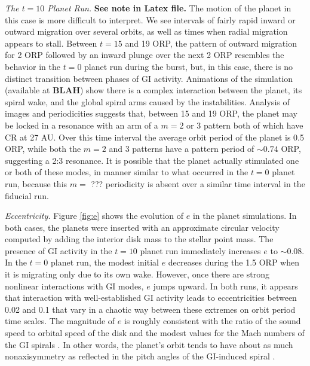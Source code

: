 \documentclass[12pt,manuscript,authoryear]{aastex}
\begin{document}
{\it The $t = 10$ Planet Run.} {\bf See note in Latex file.} The motion of the planet in this case is more difficult to interpret. We see intervals of fairly rapid inward or outward migration over several orbits, as well as times when radial migration appears to stall. Between $t = 15$ and 19 ORP, the pattern of outward migration for 2 ORP followed by an inward plunge over the next 2 ORP resembles the behavior in the $t = 0$ planet run during the burst, but, in this case, there is no distinct transition between phases of GI activity. Animations of the simulation (available at {\bf BLAH}) show there is a complex interaction between the planet, its spiral wake, and the global spiral arms caused by the instabilities. Analysis of images and periodicities suggests that, between 15 and 19 ORP, the planet may be locked in a resonance with an arm of a $m = 2$ or 3 pattern both of which have CR at 27 AU. Over this time interval the average orbit period of the planet is 0.5 ORP, while both the $m = 2$ and 3 patterns have a pattern period of $\sim 0.74$ ORP, suggesting a 2:3 resonance. It is possible that the planet actually stimulated one or both of these modes, in manner similar to what occurred in the $t = 0$ planet run, because this $m =$ ??? periodicity is absent over a similar time interval in the fiducial run.

{\it Eccentricity.} Figure \ref{fig:e} shows the evolution of $e$ in the planet simulations. In both cases, the planets were inserted with an approximate circular velocity computed by adding the interior disk mass to the stellar point mass. The presence of GI activity in the $t = 10$ planet run immediately increases $e$ to $\sim 0.08$. In the $t = 0$ planet run, the modest initial $e$ decreases during the 1.5 ORP when it is migrating only due to its own wake. However, once there are strong nonlinear interactions with GI modes, $e$ jumps upward. In both runs, it appears that interaction with well-established GI activity leads to eccentricities between 0.02 and 0.1 that vary in a chaotic way between these extremes on orbit period time scales. The magnitude of $e$ is roughly consistent with the ratio of the sound speed to orbital speed of the disk and the modest values for the Mach numbers of the GI spirals \citep{boley2006a,boley2008}. In other words, the planet's orbit tends to have about as much nonaxisymmetry as reflected in the pitch angles of the GI-induced spiral \citep{cossins2009}.
\end{document}
